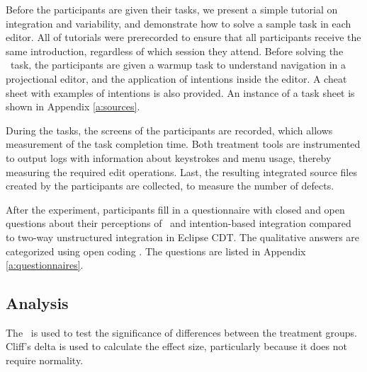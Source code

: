 Before the participants are given their tasks, we present a simple tutorial on integration and variability, and demonstrate how to solve a sample task in each editor. All of tutorials were prerecorded to ensure that all participants receive the same introduction, regardless of which session they attend. Before solving the \tooln~task, the participants are given a warmup task to understand navigation in a projectional editor, and the application of intentions inside the editor. A cheat sheet with examples of intentions is also provided. An instance of a task sheet is shown in Appendix \ref{a:sources}.

During the tasks, the screens of the participants are recorded, which allows measurement of the task completion time. Both treatment tools are instrumented to output logs with information about keystrokes and menu usage, thereby measuring the required edit operations. Last, the resulting integrated source files created by the participants are collected, to measure the number of defects.

After the experiment, participants fill in a questionnaire with closed and open questions about their perceptions of \tooln~and intention-based integration compared to two-way unstructured integration in Eclipse CDT. The qualitative answers are categorized using open coding \cite{strauss}. The questions are listed in Appendix \ref{a:questionnaires}.

\subsection{Analysis}
The \anova~is used to test the significance of differences between the treatment groups. Cliff's delta is used to calculate the effect size, particularly because it does not require normality.
